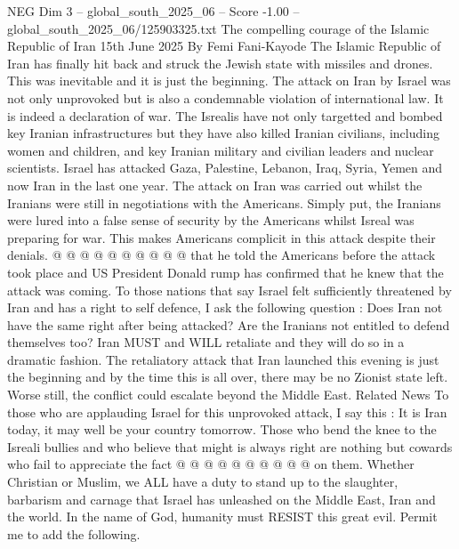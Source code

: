 \begin{textsample}{NEG Dim 3 – global\_south\_2025\_06 – Score -1.00 – global\_south\_2025\_06/125903325.txt}  \label{ex:f3_neg_269}
The compelling courage of the Islamic Republic of Iran 15th June 2025 By Femi Fani-Kayode The Islamic Republic of Iran has finally hit back and struck the Jewish state with missiles and drones.
This was inevitable and it is just the beginning.
The attack on Iran by Israel was not only unprovoked but is also a condemnable violation of international law.
It is indeed a declaration of war.
The Isrealis have not only targetted and bombed key Iranian infrastructures but they have also killed Iranian civilians, including women and children, and key Iranian military and civilian leaders and nuclear scientists.
Israel has attacked Gaza, Palestine, Lebanon, Iraq, Syria, Yemen and now Iran in the last one year.
The attack on Iran was carried out whilst the Iranians were still in negotiations with the Americans.
Simply put, the Iranians were lured into a false sense of security by the Americans whilst Isreal was preparing for war.
This makes Americans complicit in this attack despite their denials. @ @ @ @ @ @ @ @ @ @ that he told the Americans before the attack took place and US President Donald rump has confirmed that he knew that the attack was coming.
To those nations that say Israel felt sufficiently threatened by Iran and has a right to self defence, I ask the following question : Does Iran not have the same right after being attacked?
Are the Iranians not entitled to defend themselves too?
Iran MUST and WILL retaliate and they will do so in a dramatic fashion.
The retaliatory attack that Iran launched this evening is just the beginning and by the time this is all over, there may be no Zionist state left.
Worse still, the conflict could escalate beyond the Middle East.
Related News To those who are applauding Israel for this unprovoked attack, I say this : It is Iran today, it may well be your country tomorrow.
Those who bend the knee to the Isreali bullies and who believe that might is always right are nothing but cowards who fail to appreciate the fact @ @ @ @ @ @ @ @ @ @ on them.
Whether Christian or Muslim, we ALL have a duty to stand up to the slaughter, barbarism and carnage that Israel has unleashed on the Middle East, Iran and the world.
In the name of God, humanity must RESIST this great evil.
Permit me to add the following.

\end{textsample}
